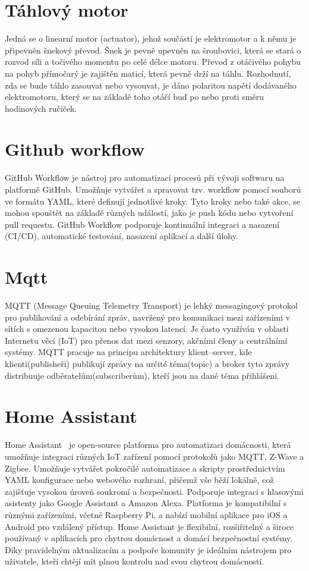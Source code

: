 \section{Táhlový motor}\label{sec:tahlovy-motor}
Jedná se o linearní motor (actuator), jehož součástí je elektromotor a k němu je připevněn šnekový převod.
Šnek je pevně upevněn na šroubovici, která se stará o rozvod síli a točivého momentu po celé délce motoru.
Převod z otáčivého pohybu na pohyb přímočarý je zajištěn maticí, která pevně drží na táhlu.
Rozhodnutí, zda se bude táhlo zasouvat nebo vysouvat, je dáno polaritou napětí dodávaného elektromotoru, který se na základě toho otáčí buď po nebo proti směru hodinových ručiček.

\section{Github workflow}\label{sec:github-workflow}
GitHub Workflow je nástroj pro automatizaci procesů při vývoji softwaru na platformě GitHub.
Umožňuje vytvářet a spravovat tzv. workflow pomocí souborů ve formátu YAML, které definují jednotlivé kroky.
Tyto kroky nebo také akce, se mohou spouštět na základě různých událostí, jako je push kódu nebo vytvoření pull requestu.
GitHub Workflow podporuje kontinuální integraci a nasazení (CI/CD), automatické testování, nasazení aplikací a další úlohy.

\section{Mqtt}\label{sec:mqtt}
MQTT (Message Queuing Telemetry Transport) je lehký messagingový protokol pro publikování a odebírání zpráv, navržený pro komunikaci mezi zařízeními v sítích s omezenou kapacitou nebo vysokou latencí.
Je často využíván v oblasti Internetu věcí (IoT) pro přenos dat mezi senzory, akčními členy a centrálními systémy.
MQTT pracuje na principu architektury klient–server, kde klienti(publisheři) publikují zprávy na určité téma(topic) a broker tyto zprávy distribuuje odběratelům(subscriberům), kteří jsou na dané téma přihlášeni.

\section{Home Assistant}\label{sec:home-assistant}
Home Assistant~\cite{co-je-to-ha} je open-source platforma pro automatizaci domácnosti, která umožňuje integraci různých IoT zařízení pomocí protokolů jako MQTT, Z-Wave a Zigbee.
Umožňuje vytvářet pokročilé automatizace a skripty prostřednictvím YAML konfigurace nebo webového rozhraní, přičemž vše běží lokálně, což zajišťuje vysokou úroveň soukromí a bezpečnosti.
Podporuje integraci s hlasovými asistenty jako Google Assistant a Amazon Alexa.
Platforma je kompatibilní s různými zařízeními, včetně Raspberry Pi, a nabízí mobilní aplikace pro iOS a Android pro vzdálený přístup.
Home Assistant je flexibilní, rozšiřitelný a široce používaný v aplikacích pro chytrou domácnost a domácí bezpečnostní systémy.
Díky pravidelným aktualizacím a podpoře komunity je ideálním nástrojem pro uživatele, kteří chtějí mít plnou kontrolu nad svou chytrou domácností.

